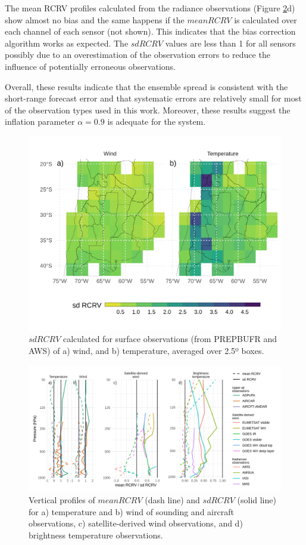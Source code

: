 \documentclass[final,5p,times,twocolumn,authoryear]{elsarticle} %
\begin{document}
The mean RCRV profiles calculated from the radiance observations (Figure \ref{fig:rcrv-profile}d) show almost no bias and the same happens if the \(mean RCRV\) is calculated over each channel of each sensor (not shown). This indicates that the bias correction algorithm works as expected. The \(sd RCRV\) values are less than 1 for all sensors possibly due to an overestimation of the observation errors to reduce the influence of potentially erroneous observations.

Overall, these results indicate that the ensemble spread is consistent with the short-range forecast error and that systematic errors are relatively small for most of the observation types used in this work. Moreover, these results suggest the inflation parameter \(\alpha = 0.9\) is adequate for the system.



\begin{figure}
\includegraphics[width=1\linewidth]{../figures/rcrv-sfc-1} \caption{\(sd RCRV\) calculated for surface observations (from PREPBUFR and AWS) of a) wind, and b) temperature, averaged over 2.5º boxes.}\label{fig:rcrv-sfc}
\end{figure}



\begin{figure}
\includegraphics{../figures/rcrv-profile-1} \caption{Vertical profiles of \(mean RCRV\) (dash line) and \(sd RCRV\) (solid line) for a) temperature and b) wind of sounding and aircraft observations, c) satellite-derived wind observations, and d) brightness temperature observations.}\label{fig:rcrv-profile}
\end{figure}
\end{document}
